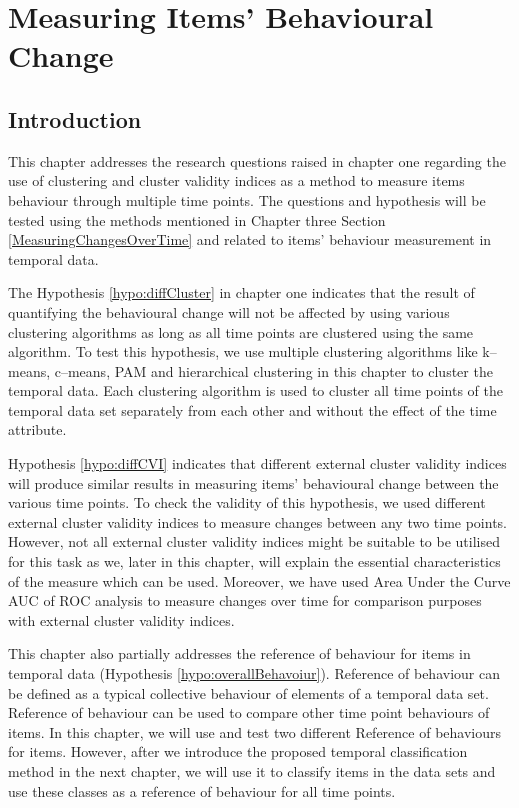 \chapter{Measuring Items' Behavioural Change}
\label{Chap:Measuring}

 
 \section{Introduction}
 
 This chapter addresses the research questions raised in chapter one regarding the use of clustering and cluster validity indices as a method to measure items behaviour through multiple time points. The questions and hypothesis will be tested using the methods mentioned in Chapter three Section \ref{MeasuringChangesOverTime} and related to items' behaviour measurement in temporal data.
 
 The Hypothesis \ref{hypo:diffCluster} in chapter one indicates that the result of quantifying the behavioural change will not be affected by using various clustering algorithms as long as all time points are clustered using the same algorithm. To test this hypothesis, we use multiple clustering algorithms like k--means, c--means, PAM and hierarchical clustering in this chapter to cluster the temporal data. Each clustering algorithm is used to cluster all time points of the temporal data set separately from each other and without the effect of the time attribute.
 
 Hypothesis \ref{hypo:diffCVI} indicates that different external cluster validity indices will produce similar results in measuring items' behavioural change between the various time points. To check the validity of this hypothesis, we used different external cluster validity indices to measure changes between any two time points. However, not all external cluster validity indices might be suitable to be utilised for this task as we, later in this chapter, will explain the essential characteristics of the measure which can be used. Moreover, we have used Area Under the Curve AUC of ROC analysis to measure changes over time for comparison purposes with external cluster validity indices.
 
 This chapter also partially addresses the reference of behaviour for items in temporal data (Hypothesis \ref{hypo:overallBehavoiur}). Reference of behaviour can be defined as a typical collective behaviour of elements of a temporal data set. Reference of behaviour can be used to compare other time point behaviours of items. In this chapter, we will use and test two different Reference of behaviours for items. However, after we introduce the proposed temporal classification method in the next chapter, we will use it to classify items in the data sets and use these classes as a reference of behaviour for all time points.
 
